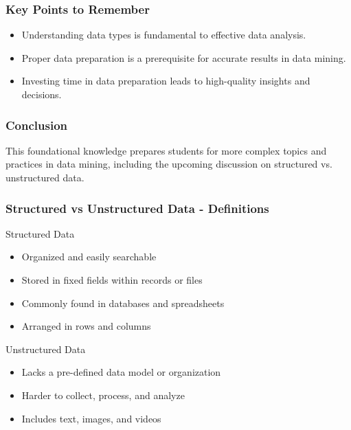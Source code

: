 \documentclass{beamer}
\begin{document}
\begin{frame}[fragile]
    \frametitle{Key Points to Remember}
    \begin{itemize}
        \item Understanding data types is fundamental to effective data analysis.
        \item Proper data preparation is a prerequisite for accurate results in data mining.
        \item Investing time in data preparation leads to high-quality insights and decisions.
    \end{itemize}
\end{frame}

\begin{frame}[fragile]
    \frametitle{Conclusion}
    This foundational knowledge prepares students for more complex topics and practices in data mining, including the upcoming discussion on structured vs. unstructured data.
\end{frame}

\begin{frame}[fragile]
    \frametitle{Structured vs Unstructured Data - Definitions}
    \begin{block}{Structured Data}
        \begin{itemize}
            \item Organized and easily searchable
            \item Stored in fixed fields within records or files
            \item Commonly found in databases and spreadsheets
            \item Arranged in rows and columns
        \end{itemize}
    \end{block}
    
    \begin{block}{Unstructured Data}
        \begin{itemize}
            \item Lacks a pre-defined data model or organization
            \item Harder to collect, process, and analyze
            \item Includes text, images, and videos
        \end{itemize}
    \end{block}
\end{frame}
\end{document}
